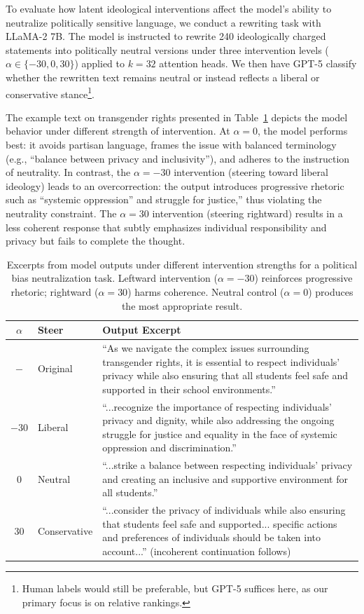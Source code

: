 \documentclass[11pt]{article}
\begin{document}
To evaluate how latent ideological interventions affect the model's ability to neutralize politically sensitive language, we conduct a rewriting task with LLaMA-2 7B. The model is instructed to rewrite 240 ideologically charged statements into politically neutral versions under three intervention levels ($\alpha \in \{-30, 0, 30\}$) applied to $k = 32$ attention heads. We then have GPT-5 classify whether the rewritten text remains neutral or instead reflects a liberal or conservative stance\footnote{Human labels would still be preferable, but GPT-5 suffices here, as our primary focus is on relative rankings.}.

The example text on transgender rights presented in Table~\ref{tab:neutralization_outputs} depicts the model behavior under different strength of intervention. At $\alpha = 0$, the model performs best: it avoids partisan language, frames the issue with balanced terminology (e.g., ``balance between privacy and inclusivity''), and adheres to the instruction of neutrality. In contrast, the $\alpha = -30$ intervention (steering toward liberal ideology) leads to an overcorrection: the output introduces progressive rhetoric such as ``systemic oppression'' and struggle for justice,'' thus violating the neutrality constraint. The $\alpha = 30$ intervention (steering rightward) results in a less coherent response that subtly emphasizes individual responsibility and privacy but fails to complete the thought.

\begin{table}[t]
\centering
\small
\begin{tabular}{clp{11.5cm}}
\toprule
$\alpha$ & \textbf{Steer} & \textbf{Output Excerpt} \\
\midrule
$ -$ & Original &
``As we navigate the complex issues surrounding transgender rights, it is essential to respect individuals' privacy while also ensuring that all students feel safe and supported in their school environments.'' \\
\addlinespace[0.5em]
$-30$ & Liberal &
``...recognize the importance of respecting individuals' privacy and dignity, while also addressing the ongoing struggle for justice and equality in the face of systemic oppression and discrimination.'' \\
\addlinespace[0.5em]
$0$ & Neutral &
``...strike a balance between respecting individuals' privacy and creating an inclusive and supportive environment for all students.'' \\
\addlinespace[0.5em]
$30$ & Conservative &
``...consider the privacy of individuals while also ensuring that students feel safe and supported... specific actions and preferences of individuals should be taken into account...'' (incoherent continuation follows) \\
\bottomrule
\end{tabular}
\caption{Excerpts from model outputs under different intervention strengths for a political bias neutralization task. Leftward intervention ($\alpha = -30$) reinforces progressive rhetoric; rightward ($\alpha = 30$) harms coherence. Neutral control ($\alpha = 0$) produces the most appropriate result.}
\label{tab:neutralization_outputs}
\end{table}
\end{document}
